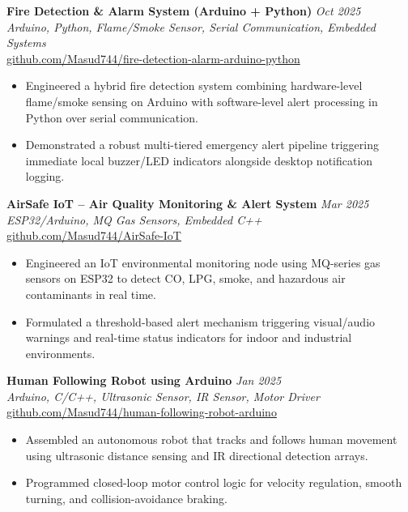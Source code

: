 \documentclass[11pt,a4paper]{article}
\begin{document}
\textbf{Fire Detection \& Alarm System (Arduino + Python)} \hfill \textit{Oct 2025} \\
\textit{Arduino, Python, Flame/Smoke Sensor, Serial Communication, Embedded Systems} \\
\href{https://github.com/Masud744/fire-detection-alarm-arduino-python}{github.com/Masud744/fire-detection-alarm-arduino-python}
\begin{itemize}
    \item Engineered a hybrid fire detection system combining hardware-level flame/smoke sensing on Arduino with software-level alert processing in Python over serial communication.
    \item Demonstrated a robust multi-tiered emergency alert pipeline triggering immediate local buzzer/LED indicators alongside desktop notification logging.
\end{itemize}

\textbf{AirSafe IoT -- Air Quality Monitoring \& Alert System} \hfill \textit{Mar 2025} \\
\textit{ESP32/Arduino, MQ Gas Sensors, Embedded C++} \\
\href{https://github.com/Masud744/AirSafe-IoT}{github.com/Masud744/AirSafe-IoT}
\begin{itemize}
    \item Engineered an IoT environmental monitoring node using MQ-series gas sensors on ESP32 to detect CO, LPG, smoke, and hazardous air contaminants in real time.
    \item Formulated a threshold-based alert mechanism triggering visual/audio warnings and real-time status indicators for indoor and industrial environments.
\end{itemize}

\textbf{Human Following Robot using Arduino} \hfill \textit{Jan 2025} \\
\textit{Arduino, C/C++, Ultrasonic Sensor, IR Sensor, Motor Driver} \\
\href{https://github.com/Masud744/human-following-robot-arduino}{github.com/Masud744/human-following-robot-arduino}
\begin{itemize}
    \item Assembled an autonomous robot that tracks and follows human movement using ultrasonic distance sensing and IR directional detection arrays.
    \item Programmed closed-loop motor control logic for velocity regulation, smooth turning, and collision-avoidance braking.
\end{itemize}
\end{document}
